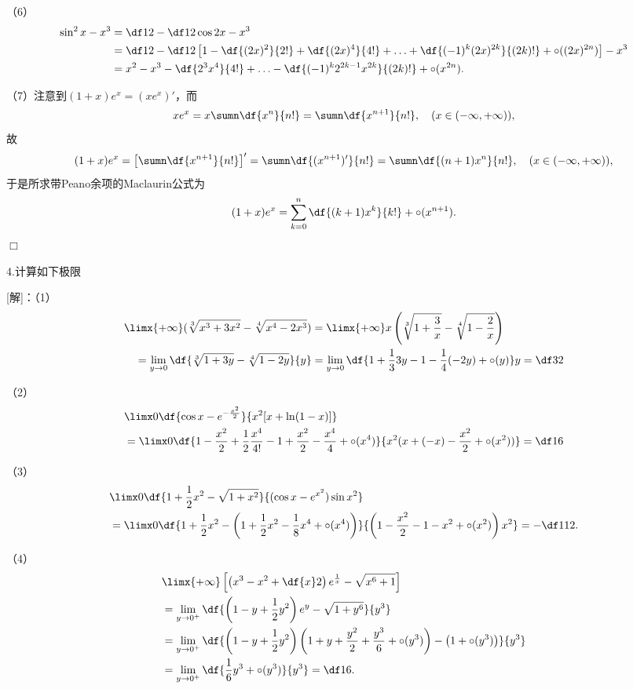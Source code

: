 （6）
\begin{align*}
	\sin^2x-x^3&=\df12-\df12\cos2x-x^3\\
	&=\df12-\df12\left[1-\df{(2x)^2}{2!}+\df{(2x)^4}{4!}
	+\ldots+\df{(-1)^k(2x)^{2k}}{(2k)!}+\circ((2x)^{2n})\right]-x^3\\
	&=x^2-x^3-\df{2^3x^4}{4!}
	+\ldots-\df{(-1)^k2^{2k-1}x^{2k}}{(2k)!}+\circ(x^{2n}).
\end{align*}

（7）注意到$(1+x)e^x=(xe^x)'$，而
$$xe^x=x\sumn\df{x^n}{n!}=\sumn\df{x^{n+1}}{n!},
\quad(x\in(-\infty,+\infty)),$$
故
$$(1+x)e^x=\left[\sumn\df{x^{n+1}}{n!}\right]'
=\sumn\df{(x^{n+1})'}{n!}
=\sumn\df{(n+1)x^n}{n!},
\quad(x\in(-\infty,+\infty)),$$
于是所求带Peano余项的Maclaurin公式为
$$(1+x)e^x=\sum\limits_{k=0}^n\df{(k+1)x^k}{k!}+\circ(x^{n+1}).$$
\hfill$\Box$

\bigskip

4.计算如下极限

[解]：（1）
\begin{align*}
	&\limx{+\infty}(\sqrt[3]{x^3+3x^2}-\sqrt[4]{x^4-2x^3})
	=\limx{+\infty}x\left(\sqrt[3]{1+\frac3x}
	-\sqrt[4]{1-\frac2x}\right)\\
	&\quad =\lim\limits_{y\to0}\df{\sqrt[3]{1+3y}
	-\sqrt[4]{1-2y}}{y}
	=\lim\limits_{y\to0}\df{1+\frac133y-1-\frac14(-2y)+\circ(y)}y=\df32
\end{align*}

（2）
\begin{align*}
	&\limx0\df{\cos x-e^{-\frac{x^2}2}}{x^2[x+\ln(1-x)]}\\
	&=\limx0\df{1-\frac{x^2}2+\frac12\frac{x^4}{4!}-1+\frac{x^2}2
	-\frac{x^4}{4}+\circ(x^4)}{x^2(x+(-x)-\frac{x^2}2+\circ(x^2))}
	=\df16
\end{align*}

（3）
\begin{align*}
	&\limx0\df{1+\frac12x^2-\sqrt{1+x^2}}{(\cos x-e^{x^2})\sin x^2}\\
	&=\limx0\df{1+\frac12x^2-\left(1+\frac12x^2-\frac18x^4+\circ(x^4)\right)}
	{\left(1-\frac{x^2}2-1-x^2+\circ(x^2)\right)x^2}=-\df1{12}.
\end{align*}

（4）
\begin{align*}
	&\limx{+\infty}\left[\left(x^3-x^2+\df{x}2\right)e^{\frac1x}
	-\sqrt{x^6+1}\right]\\
	&=\lim\limits_{y\to0^+}\df{\left(1-y+\frac12y^2
	\right)e^y-\sqrt{1+y^6}}{y^3}\\
	&=\lim\limits_{y\to0^+}\df{\left(1-y+\frac12y^2
	\right)\left(1+y+\frac{y^2}2+\frac{y^3}6+\circ(y^3)\right)
	-\left(1+\circ(y^3)\right)}{y^3}\\
	&=\lim\limits_{y\to0^+}\df{\frac16y^3+\circ(y^3)}{y^3}=\df16.
\end{align*}

